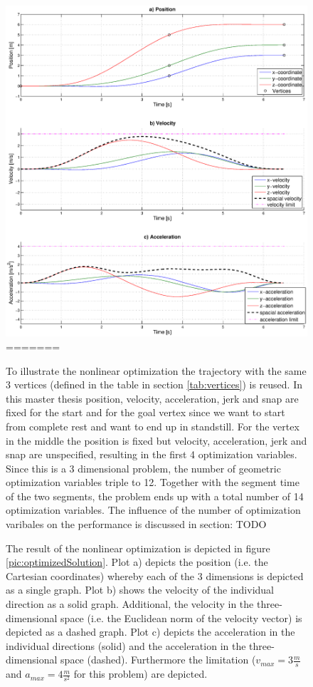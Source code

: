 \begin{figure}[h]
   \centering
   \includegraphics[trim = 35mm 20mm 30mm 8mm,clip,width=1\textwidth]{pics/2SegOpti6s52k100.eps}
=======

To illustrate the nonlinear optimization the trajectory with the same 3 vertices (defined in the table in section \ref{tab:vertices}) is reused. In this master thesis position, velocity, acceleration, jerk and snap are fixed for the start and for the goal vertex since we want to start from complete rest and want to end up in standstill. For the vertex in the middle the position is fixed but velocity, acceleration, jerk and snap are unspecified, resulting in the first 4 optimization variables. Since this is a 3 dimensional problem, the number of geometric optimization variables triple to 12. Together with the segment time of the two segments, the problem ends up with a total number of 14 optimization variables. The influence of the number of optimization varibales on the performance is discussed in section: TODO \newpage

The result of the nonlinear optimization is depicted in figure \ref{pic:optimizedSolution}. Plot a) depicts the position (i.e. the Cartesian coordinates) whereby each of the 3 dimensions is depicted as a single graph. Plot b) shows the velocity of the individual direction as a solid graph. Additional, the velocity in the three-dimensional space (i.e. the Euclidean norm of the velocity vector) is depicted as a dashed graph. Plot c) depicts the acceleration in the individual directions (solid) and the acceleration in the three-dimensional space (dashed). Furthermore the limitation ($v_{max} = 3 \frac{m}{s}$ and $a_{max} = 4 \frac{m}{s^2}$ for this problem) are depicted.
\vspace*{3\baselineskip}


\end{figure}
